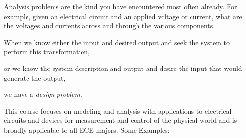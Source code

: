 \begin{center}
\end{center}

Analysis problems are the kind you have encountered most often already. For example, given an electrical circuit and an applied voltage or current, what are the voltages and currents across and through the various components.

When we know either the input and desired output and seek the system to perform this transformation,
\begin{center}
\end{center}

or we know the system description and output and desire the input that would generate the output,

\begin{center}
\end{center}

we have a \textit{design problem}.

This course focuses on modeling and analysis with applications to electrical circuits and devices for measurement and control of the physical world and is broadly applicable to all ECE majors. Some Examples:

